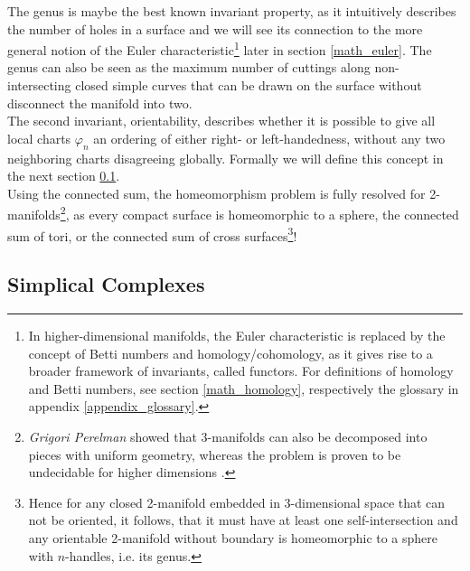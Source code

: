 The genus is maybe the best known invariant property, as it intuitively describes the number of holes in a surface and we will see its connection to the more general notion of the Euler characteristic\footnote{ In higher-dimensional manifolds, the Euler characteristic is replaced by the concept of Betti numbers and homology/cohomology, as it gives rise to a broader framework of invariants, called functors. For definitions of homology and Betti numbers, see section \ref{math_homology}, respectively the glossary in appendix \ref{appendix_glossary}.} later in section \ref{math_euler}.
The genus can also be seen as the maximum number of cuttings along non-intersecting closed simple curves that can be drawn on the surface without disconnect the manifold into two.\\
The second invariant, orientability, describes whether it is possible to give all local charts $\varphi_{n}$ an ordering of either right- or left-handedness, without any two neighboring charts disagreeing globally.
Formally we will define this concept in the next section \ref{math_simplicalcomplexes}.\\
Using the connected sum, the homeomorphism problem is fully resolved for 2-manifolds\footnote{ \textit{Grigori Perelman} showed that 3-manifolds can also be decomposed into pieces with uniform geometry, whereas the problem is proven to be undecidable for higher dimensions \citep[][]{Morgan2007}.}, as every compact surface is homeomorphic to a sphere, the connected sum of tori, or the connected sum of cross surfaces\footnote{ Hence for any closed 2-manifold embedded in 3-dimensional space that can not be oriented, it follows, that it must have at least one self-intersection and any orientable 2-manifold without boundary is homeomorphic to a sphere with $n$-handles, i.e. its genus.}!

\subsection{Simplical Complexes}
\label{math_simplicalcomplexes}

